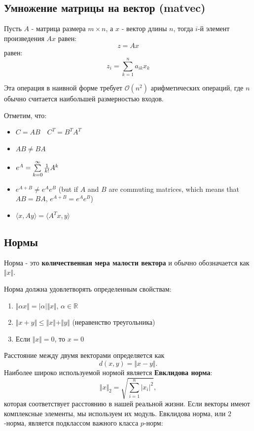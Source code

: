 \documentclass[
  russian,
  letterpaper,
  DIV=11,
  numbers=noendperiod]{scrartcl}
\providecommand{\tightlist}{%
  \setlength{\itemsep}{0pt}\setlength{\parskip}{0pt}}
\begin{document}
\subsection{Умножение матрицы на вектор
(matvec)}\label{ux443ux43cux43dux43eux436ux435ux43dux438ux435-ux43cux430ux442ux440ux438ux446ux44b-ux43dux430-ux432ux435ux43aux442ux43eux440-matvec}

Пусть \(A\) - матрица размера \(m \times n\), а \(x\) - вектор длины
\(n\), тогда \(i\)-й элемент произведения \(Ax\) равен: \[
z = Ax
\] равен: \[
z_i = \sum_{k=1}^n a_{ik}x_k
\]

Эта операция в наивной форме требует \(\mathcal{O}(n^2)\) арифметических
операций, где \(n\) обычно считается наибольшей размерностью входов.

Отметим, что:

\begin{itemize}
\tightlist
\item
  \(C = AB \quad C^T = B^T A^T\)
\item
  \(AB \neq BA\)
\item
  \(e^{A} =\sum\limits_{k=0}^{\infty }{1 \over k!}A^{k}\)
\item
  \(e^{A+B} \neq e^{A} e^{B}\) (but if \(A\) and \(B\) are commuting
  matrices, which means that \(AB = BA\), \(e^{A+B} = e^{A} e^{B}\))
\item
  \(\langle x, Ay\rangle = \langle A^T x, y\rangle\)
\end{itemize}

\subsection{Нормы}\label{ux43dux43eux440ux43cux44b}

Норма - это \textbf{количественная мера малости вектора} и обычно
обозначается как \(\Vert x \Vert\).

Норма должна удовлетворять определенным свойствам:

\begin{enumerate}
\def\labelenumi{\arabic{enumi}.}
\tightlist
\item
  \(\Vert \alpha x \Vert = \vert \alpha\vert \Vert x \Vert\),
  \(\alpha \in \mathbb{R}\)
\item
  \(\Vert x + y \Vert \leq \Vert x \Vert + \Vert y \Vert\) (неравенство
  треугольника)
\item
  Если \(\Vert x \Vert = 0\), то \(x = 0\)
\end{enumerate}

Расстояние между двумя векторами определяется как \[ 
d(x, y) = \Vert x - y \Vert. 
\] Наиболее широко используемой нормой является \textbf{Евклидова
норма}: \[
\Vert x \Vert_2 = \sqrt{\sum_{i=1}^n |x_i|^2},
\] которая соответствует расстоянию в нашей реальной жизни. Если векторы
имеют комплексные элементы, мы используем их модуль. Евклидова норма,
или \(2\)-норма, является подклассом важного класса \(p\)-норм:
\end{document}

